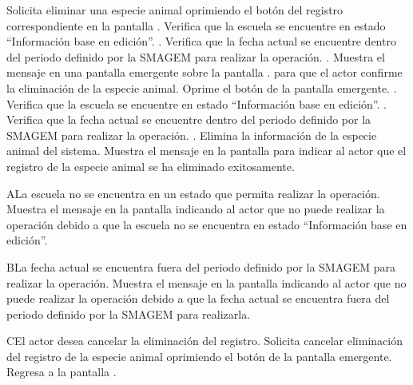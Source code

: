  \begin{UCtrayectoria}
    \UCpaso[\UCactor] Solicita eliminar una especie animal oprimiendo el botón \botKo del registro correspondiente en la pantalla .
    \UCpaso[\UCsist] Verifica que la escuela se encuentre en estado ``Información base en edición''. .
    \UCpaso[\UCsist] Verifica que la fecha actual se encuentre dentro del periodo definido por la SMAGEM para realizar la operación. .
    \UCpaso[\UCsist] Muestra el mensaje  en una pantalla emergente sobre la pantalla . para que el actor confirme la eliminación de la especie animal.
    \UCpaso[\UCactor] Oprime el botón  de la pantalla emergente. .
    \UCpaso[\UCsist] Verifica que la escuela se encuentre en estado ``Información base en edición''. .
    \UCpaso[\UCsist] Verifica que la fecha actual se encuentre dentro del periodo definido por la SMAGEM para realizar la operación. .
    \UCpaso[\UCsist] Elimina la información de la especie animal del sistema.
    \UCpaso[\UCsist] Muestra el mensaje  en la pantalla  para indicar al actor que el registro de la especie animal se ha eliminado exitosamente.    
 \end{UCtrayectoria}
 
   \begin{UCtrayectoriaA}{A}{La escuela no se encuentra en un estado que permita realizar la operación.}
    \UCpaso[\UCsist] Muestra el mensaje  en la pantalla  indicando al actor que no puede realizar la operación debido a que la escuela no se encuentra en estado ``Información base en edición''. 
 \end{UCtrayectoriaA}

   \begin{UCtrayectoriaA}{B}{La fecha actual se encuentra fuera del periodo definido por la SMAGEM para realizar la operación.}
    \UCpaso[\UCsist] Muestra el mensaje  en la pantalla  indicando al actor que no puede realizar la operación debido a que la fecha actual se encuentra fuera del periodo definido por la SMAGEM para realizarla. 
 \end{UCtrayectoriaA}
 
    \begin{UCtrayectoriaA}{C}{El actor desea cancelar la eliminación del registro.}
    \UCpaso[\UCactor] Solicita cancelar eliminación del registro de la especie animal oprimiendo el botón  de la pantalla emergente.
    \UCpaso[] Regresa a la pantalla .    
 \end{UCtrayectoriaA}
